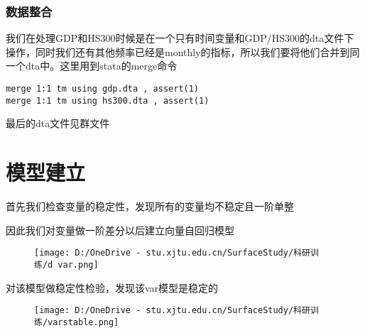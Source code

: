 \documentclass[]{article}
\begin{document}
\hypertarget{header-n89}{%
\subsubsection{数据整合}\label{header-n89}}

我们在处理GDP和HS300时候是在一个只有时间变量和GDP/HS300的dta文件下操作，同时我们还有其他频率已经是monthly的指标，所以我们要将他们合并到同一个dta中。这里用到stata的merge命令

\begin{verbatim}
merge 1:1 tm using gdp.dta , assert(1)
merge 1:1 tm using hs300.dta , assert(1)
\end{verbatim}

最后的dta文件见群文件

\hypertarget{header-n93}{%
\section{模型建立}\label{header-n93}}

首先我们检查变量的稳定性，发现所有的变量均不稳定且一阶单整

因此我们对变量做一阶差分以后建立向量自回归模型

\begin{figure}
\centering
\texttt{[image: D:/OneDrive - stu.xjtu.edu.cn/SurfaceStudy/科研训练/d var.png]}
\caption{}
\end{figure}

对该模型做稳定性检验，发现该var模型是稳定的

\begin{figure}
\centering
\texttt{[image: D:/OneDrive - stu.xjtu.edu.cn/SurfaceStudy/科研训练/varstable.png]}
\caption{}
\end{figure}
\end{document}
